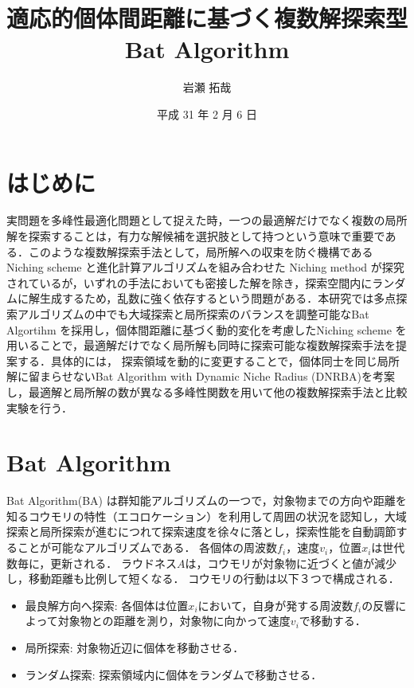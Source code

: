 \documentclass[twocolumn, a4paper]{UECIEresume}
\title{適応的個体間距離に基づく複数解探索型Bat Algorithm}
\date{平成 31 年 2 月 6 日}
\affiliation{情報学専攻 メディア情報学 プログラム}
\author{岩瀬 拓哉}
\begin{document}
\maketitle

\section{はじめに}
実問題を多峰性最適化問題として捉えた時，一つの最適解だけでなく複数の局所解を探索することは，有力な解候補を選択肢として持つという意味で重要である．このような複数解探索手法として，局所解への収束を防ぐ機構であるNiching scheme と進化計算アルゴリズムを組み合わせた Niching method が探究されているが，いずれの手法においても密接した解を除き，探索空間内にランダムに解生成するため，乱数に強く依存するという問題がある．本研究では多点探索アルゴリズムの中でも大域探索と局所探索のバランスを調整可能なBat Algortihm を採用し，個体間距離に基づく動的変化を考慮したNiching scheme を用いることで，最適解だけでなく局所解も同時に探索可能な複数解探索手法を提案する．具体的には，
探索領域を動的に変更することで，個体同士を同じ局所解に留まらせないBat Algorithm with Dynamic Niche Radius (DNRBA)を考案し，最適解と局所解の数が異なる多峰性関数を用いて他の複数解探索手法と比較実験を行う．

\section{Bat Algorithm}
Bat Algorithm(BA) \cite{BA}は群知能アルゴリズムの一つで，対象物までの方向や距離を知るコウモリの特性（エコロケーション）を利用して周囲の状況を認知し，大域探索と局所探索が進むにつれて探索速度を徐々に落とし，探索性能を自動調節することが可能なアルゴリズムである．
各個体の周波数${f_i}$，速度${v_i}$，位置${x_i}$は世代数毎に，更新される．
ラウドネス${A}$は，コウモリが対象物に近づくと値が減少し，移動距離も比例して短くなる．
コウモリの行動は以下３つで構成される．
\begin{itemize}
\item 最良解方向へ探索: 各個体は位置${x_i}$において，自身が発する周波数${f_i}$の反響によって対象物との距離を測り，対象物に向かって速度${v_i}$で移動する．
\item 局所探索: 対象物近辺に個体を移動させる．
\item ランダム探索: 探索領域内に個体をランダムで移動させる．
\end{itemize}
\end{document}
